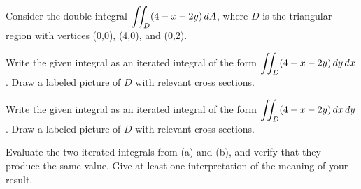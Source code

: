 \begin{activity} \label{A:11.3.1}  Consider the double integral $\displaystyle \iint_D (4-x-2y) \, dA$, where $D$ is the triangular region with vertices (0,0), (4,0), and (0,2).
		\ba
		\item Write the given integral as an iterated integral of the form $\displaystyle \iint_D (4-x-2y) \, dy \, dx$. Draw a labeled picture of $D$ with relevant cross sections.

		\item Write the given integral as an iterated integral of the form $\displaystyle \iint_D (4-x-2y) \, dx \, dy$. Draw a labeled picture of $D$ with relevant cross sections.

		\item Evaluate the two iterated integrals from (a) and (b), and verify that they produce the same value. Give at least one interpretation of the meaning of your result.

	\ea

\end{activity}
\begin{smallhint}

\end{smallhint}
\begin{bighint}

\end{bighint}
